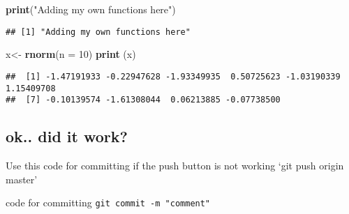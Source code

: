\documentclass[]{article}
\newenvironment{Shaded}{\begin{snugshade}}{\end{snugshade}}
\newcommand{\DataTypeTok}[1]{\textcolor[rgb]{0.13,0.29,0.53}{#1}}
\newcommand{\DecValTok}[1]{\textcolor[rgb]{0.00,0.00,0.81}{#1}}
\newcommand{\KeywordTok}[1]{\textcolor[rgb]{0.13,0.29,0.53}{\textbf{#1}}}
\newcommand{\NormalTok}[1]{#1}
\newcommand{\StringTok}[1]{\textcolor[rgb]{0.31,0.60,0.02}{#1}}
\begin{document}
\begin{Shaded}
\begin{Highlighting}[]
\KeywordTok{print}\NormalTok{(}\StringTok{"Adding my own functions here"}\NormalTok{)}
\end{Highlighting}
\end{Shaded}

\begin{verbatim}
## [1] "Adding my own functions here"
\end{verbatim}

\begin{Shaded}
\begin{Highlighting}[]
\NormalTok{x<-}\StringTok{ }\KeywordTok{rnorm}\NormalTok{(}\DataTypeTok{n =} \DecValTok{10}\NormalTok{)}
\KeywordTok{print}\NormalTok{ (x)}
\end{Highlighting}
\end{Shaded}

\begin{verbatim}
##  [1] -1.47191933 -0.22947628 -1.93349935  0.50725623 -1.03190339  1.15409708
##  [7] -0.10139574 -1.61308044  0.06213885 -0.07738500
\end{verbatim}

\hypertarget{ok..-did-it-work}{%
\subsection{ok.. did it work?}\label{ok..-did-it-work}}

Use this code for committing if the push button is not working `git push
origin master'

code for committing \texttt{git\ commit\ -m\ "comment"}
\end{document}
